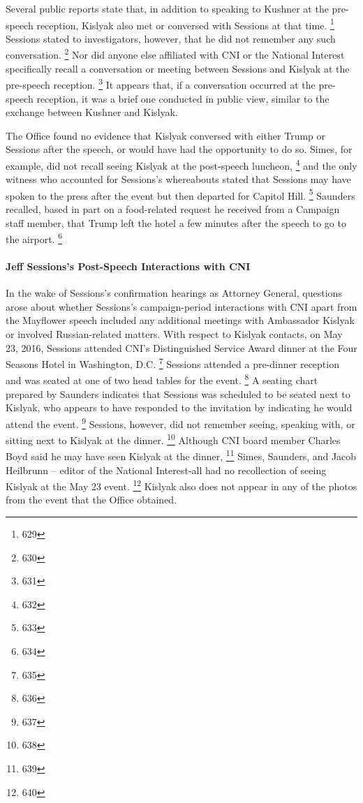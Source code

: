 Several public reports state that, in addition to speaking to Kushner at the pre-speech reception, Kislyak also met or conversed with Sessions at that time.%
\footnote{629}
Sessions stated to investigators, however, that he did not remember any such conversation.%
\footnote{630}
Nor did anyone else affiliated with CNI or the National Interest specifically recall a conversation or meeting between Sessions and Kislyak at the pre-speech reception.%
\footnote{631}
It appears that, if a conversation occurred at the pre-speech reception, it was a brief one conducted in public view, similar to the exchange between Kushner and Kislyak.

The Office found no evidence that Kislyak conversed with either Trump or Sessions after the speech, or would have had the opportunity to do so.
Simes, for example, did not recall seeing Kislyak at the post-speech luncheon,%
\footnote{632}
and the only witness who accounted for Sessions's whereabouts stated that Sessions may have spoken to the press after the event but then departed for Capitol Hill.%
\footnote{633}
Saunders recalled, based in part on a food-related request he received from a Campaign staff member, that Trump left the hotel a few minutes after the speech to go to the airport.%
\footnote{634}

\paragraph{Jeff Sessions's Post-Speech Interactions with CNI}

In the wake of Sessions's confirmation hearings as Attorney General, questions arose about whether Sessions's campaign-period interactions with CNI apart from the Mayflower speech included any additional meetings with Ambassador Kislyak or involved Russian-related matters.
With respect to Kislyak contacts, on May 23, 2016, Sessions attended CNI's Distinguished Service Award dinner at the Four Seasons Hotel in Washington, D.C.%
\footnote{635}
Sessions attended a pre-dinner reception and was seated at one of two head tables for the event.%
\footnote{636}
A seating chart prepared by Saunders indicates that Sessions was scheduled to be seated next to Kislyak, who appears to have responded to the invitation by indicating he would attend the event.%
\footnote{637}
Sessions, however, did not remember seeing, speaking with, or sitting next to Kislyak at the dinner.%
\footnote{638}
Although CNI board member Charles Boyd said he may have seen Kislyak at the dinner,%
\footnote{639}
Simes, Saunders, and Jacob Heilbrunn -- editor of the National Interest-all had no recollection of seeing Kislyak at the May 23 event.%
\footnote{640}
Kislyak also does not appear in any of the photos from the event that the Office obtained.

